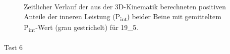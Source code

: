 \documentclass[
  letterpaper,
  DIV=11]{scrartcl}
\makeatletter
\let\oldparagraph\paragraph
\renewcommand{\paragraph}{
    \@ifstar
      \xxxParagraphStar
      \xxxParagraphNoStar
  }
\newcommand{\xxxParagraphStar}[1]{\oldparagraph*{#1}\mbox{}}
\newcommand{\xxxParagraphNoStar}[1]{\oldparagraph{#1}\mbox{}}
\makeatother
\begin{document}
\begin{figure}


\caption{\label{fig-PInt_Kinematik_19_5}Zeitlicher Verlauf der aus der
3D-Kinematik berechneten positiven Anteile der inneren Leistung
(P\textsubscript{int}) beider Beine mit gemitteltem
P\textsubscript{int}-Wert (grau gestrichelt) für 19\_5.}

\end{figure}%

\paragraph{Test 6}
\end{document}
